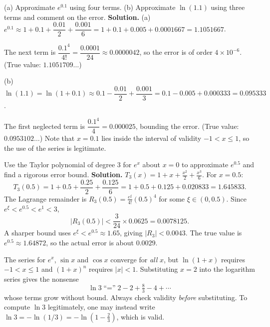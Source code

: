 \documentclass[11pt]{article}
\begin{document}
\begin{exoresolu}
(a) Approximate $e^{0.1}$ using four terms. (b) Approximate $\ln(1.1)$ using three terms and comment on the error.
\tcblower
\textbf{Solution.} (a) $e^{0.1} \approx 1 + 0.1 + \dfrac{0.01}{2} + \dfrac{0.001}{6} = 1 + 0.1 + 0.005 + 0.0001667 = 1.1051667$.

The next term is $\dfrac{0.1^4}{4!} = \dfrac{0.0001}{24} \approx 0.0000042$, so the error is of order $4 \times 10^{-6}$. (True value: $1.1051709\ldots$)

(b) $\ln(1.1) = \ln(1 + 0.1) \approx 0.1 - \dfrac{0.01}{2} + \dfrac{0.001}{3} = 0.1 - 0.005 + 0.000333 = 0.095333$.

The first neglected term is $\dfrac{0.1^4}{4} = 0.000025$, bounding the error. (True value: $0.0953102\ldots$) Note that $x = 0.1$ lies inside the interval of validity $-1 < x \le 1$, so the use of the series is legitimate.
\end{exoresolu}

\begin{exoresolu}
Use the Taylor polynomial of degree 3 for $e^x$ about $x=0$ to approximate $e^{0.5}$ and find a rigorous error bound.
\tcblower
\textbf{Solution.} $T_3(x) = 1 + x + \frac{x^2}{2} + \frac{x^3}{6}$. For $x=0.5$:
\[ T_3(0.5) = 1 + 0.5 + \frac{0.25}{2} + \frac{0.125}{6} = 1 + 0.5 + 0.125 + 0.020833 = 1.645833. \]
The Lagrange remainder is $R_3(0.5) = \frac{e^{\xi}}{4!}(0.5)^4$ for some $\xi \in (0, 0.5)$. Since $e^{\xi} < e^{0.5} < e^1 < 3$,
\[ |R_3(0.5)| < \frac{3}{24} \times 0.0625 = 0.0078125. \]
A sharper bound uses $e^{\xi} < e^{0.5} \approx 1.65$, giving $|R_3| < 0.0043$. The true value is $e^{0.5} \approx 1.64872$, so the actual error is about $0.0029$.
\end{exoresolu}

\begin{attention}
The series for $e^x$, $\sin x$ and $\cos x$ converge for \emph{all} $x$, but $\ln(1+x)$ requires $-1 < x \le 1$ and $(1+x)^n$ requires $|x| < 1$. Substituting $x = 2$ into the logarithm series gives the nonsense
\[ \ln 3 \;\text{``=''}\; 2 - 2 + \tfrac{8}{3} - 4 + \cdots \]
whose terms grow without bound. Always check validity \emph{before} substituting. To compute $\ln 3$ legitimately, one may instead write $\ln 3 = -\ln(1/3) = -\ln\!\left(1 - \tfrac{2}{3}\right)$, which is valid.
\end{attention}
\end{document}
